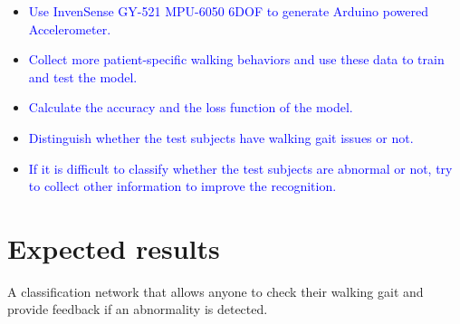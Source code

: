 \documentclass[10pt,twocolumn,letterpaper]{article}
\begin{document}
\begin{itemize}
    \item \textcolor{blue}{Use InvenSense GY-521 MPU-6050 6DOF to generate Arduino powered Accelerometer.}
    \item \textcolor{blue}{Collect more patient-specific walking behaviors and use these data to train and test the model.}
    \item \textcolor{blue}{Calculate the accuracy and the loss function of the model.}
    \item \textcolor{blue}{Distinguish whether the test subjects have walking gait issues or not.}
    \item \textcolor{blue}{If it is difficult to classify whether the test subjects are abnormal or not, try to collect other information to improve the recognition.}
\end{itemize}

\section{Expected results}
\label{sec:results}

A classification network that allows anyone to check their walking gait and provide feedback if an abnormality is detected.

{\small


}
\end{document}
